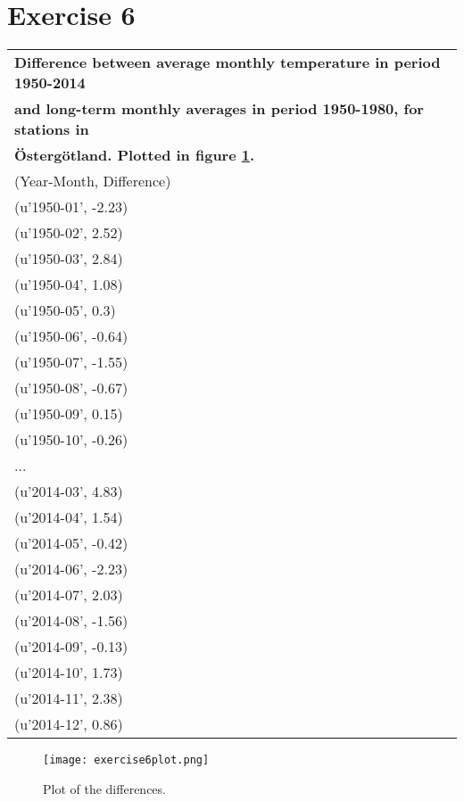 \documentclass[a4paper,titlepage,12pt]{article}
\begin{document}
\section{Exercise 6}
\begin{tabular}{l}
  \bf Difference between average monthly temperature in period 1950-2014 \\
  \bf and long-term monthly averages in period 1950-1980, for stations in \\
  \bf Östergötland. Plotted in figure \ref{diffplot}. \\ 
  (Year-Month, Difference) \\
  \hline
  (u'1950-01', -2.23) \\ 
  (u'1950-02', 2.52)  \\ 
  (u'1950-03', 2.84)  \\
  (u'1950-04', 1.08)  \\
  (u'1950-05', 0.3)   \\
  (u'1950-06', -0.64) \\
  (u'1950-07', -1.55) \\
  (u'1950-08', -0.67) \\
  (u'1950-09', 0.15)  \\
  (u'1950-10', -0.26) \\
  ... \\
  (u'2014-03', 4.83)  \\
  (u'2014-04', 1.54)  \\
  (u'2014-05', -0.42) \\
  (u'2014-06', -2.23) \\
  (u'2014-07', 2.03)  \\
  (u'2014-08', -1.56) \\
  (u'2014-09', -0.13) \\
  (u'2014-10', 1.73)  \\
  (u'2014-11', 2.38)  \\
  (u'2014-12', 0.86)  \\
\end{tabular}

\begin{figure}[H]
  \texttt{[image: exercise6plot.png]}
  \caption{Plot of the differences.}
  \label{diffplot}
\end{figure}
\end{document}
